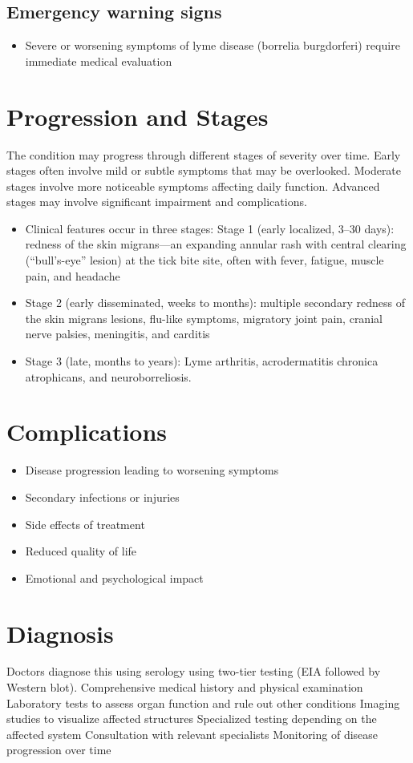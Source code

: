 \subsection{Emergency warning signs}
\begin{itemize}[noitemsep]
  \item Severe or worsening symptoms of lyme disease (borrelia burgdorferi) require immediate medical evaluation
\end{itemize}
\section{Progression and Stages}
The condition may progress through different stages of severity over time. Early stages often involve mild or subtle symptoms that may be overlooked. Moderate stages involve more noticeable symptoms affecting daily function. Advanced stages may involve significant impairment and complications.

\begin{itemize}[noitemsep]
  \item Clinical features occur in three stages: Stage 1 (early localized, 3--30 days): redness of the skin migrans---an expanding annular rash with central clearing (``bull's-eye'' lesion) at the tick bite site, often with fever, fatigue, muscle pain, and headache
  \item Stage 2 (early disseminated, weeks to months): multiple secondary redness of the skin migrans lesions, flu-like symptoms, migratory joint pain, cranial nerve palsies, meningitis, and carditis
  \item Stage 3 (late, months to years): Lyme arthritis, acrodermatitis chronica atrophicans, and neuroborreliosis.
\end{itemize}
\section{Complications}
\begin{itemize}[noitemsep]
  \item Disease progression leading to worsening symptoms
  \item Secondary infections or injuries
  \item Side effects of treatment
  \item Reduced quality of life
  \item Emotional and psychological impact
\end{itemize}
\section{Diagnosis}
Doctors diagnose this using serology using two-tier testing (EIA followed by Western blot). Comprehensive medical history and physical examination Laboratory tests to assess organ function and rule out other conditions Imaging studies to visualize affected structures Specialized testing depending on the affected system Consultation with relevant specialists Monitoring of disease progression over time

